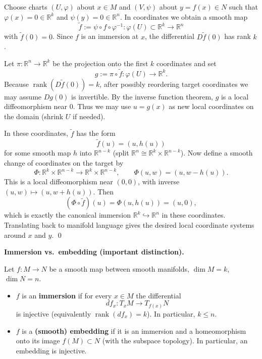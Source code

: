\begin{solution}
Choose charts $(U,\varphi)$ about $x\in M$ and $(V,\psi)$ about $y=f(x)\in N$ such that
$\varphi(x)=0\in\mathbb{R}^k$ and $\psi(y)=0\in\mathbb{R}^n$. In coordinates we obtain a smooth map
\[
\tilde f := \psi\circ f\circ \varphi^{-1} : \varphi(U)\subset\mathbb{R}^k \longrightarrow \mathbb{R}^n
\]
with $\tilde f(0)=0$. Since $f$ is an immersion at $x$, the differential $D\tilde f(0)$ has rank $k$.

Let $\pi:\mathbb{R}^n\to\mathbb{R}^k$ be the projection onto the first $k$ coordinates and set
\[
g:=\pi\circ \tilde f : \varphi(U)\to \mathbb{R}^k.
\]
Because $\operatorname{rank}(D\tilde f(0))=k$, after possibly reordering target coordinates we may assume
$Dg(0)$ is invertible. By the inverse function theorem, $g$ is a local diffeomorphism near $0$.
Thus we may use $u=g(x)$ as new local coordinates on the domain (shrink $U$ if needed).

In these coordinates, $\tilde f$ has the form
\[
\tilde f(u)=(u,h(u))
\]
for some smooth map $h$ into $\mathbb{R}^{n-k}$ (split $\mathbb{R}^n\cong\mathbb{R}^k\times\mathbb{R}^{n-k}$).
Now define a smooth change of coordinates on the target by
\[
\Phi:\mathbb{R}^k\times\mathbb{R}^{n-k}\to\mathbb{R}^k\times\mathbb{R}^{n-k},\qquad
\Phi(u,w)=(u,w-h(u)).
\]
This is a local diffeomorphism near $(0,0)$, with inverse $(u,w)\mapsto (u,w+h(u))$.
Then
\[
(\Phi\circ \tilde f)(u)=\Phi(u,h(u))=(u,0),
\]
which is exactly the canonical immersion $\mathbb{R}^k\hookrightarrow\mathbb{R}^n$ in these coordinates.
Translating back to manifold language gives the desired local coordinate systems around $x$ and $y$.
\qed


\par\medskip\noindent\textbf{Immersion vs.\ embedding (important distinction).}\par\smallskip

Let $f:M\to N$ be a smooth map between smooth manifolds, $\dim M=k$, $\dim N=n$.

\begin{itemize}
	\item $f$ is an \textbf{immersion} if for every $x\in M$ the differential
	\[
	df_x:T_xM\to T_{f(x)}N
	\]
	is injective (equivalently $\operatorname{rank}(df_x)=k$). In particular, $k\le n$.
	
	\item $f$ is a \textbf{(smooth) embedding} if it is an immersion and a homeomorphism onto its image
	$f(M)\subset N$ (with the subspace topology). In particular, an embedding is injective.
\end{itemize}


\end{solution}
